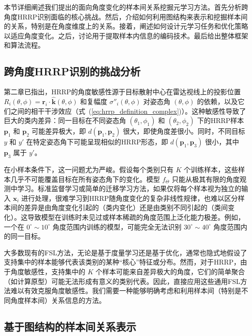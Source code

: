 本节详细阐述我们提出的面向角度变化的样本间关系挖掘元学习方法。首先分析跨角度HRRP识别面临的核心挑战。然后，介绍如何利用图结构来表示和挖掘样本间的关系，特别是在角度维度上的关系。接着，阐述如何设计元学习任务和优化策略以适应角度变化。之后，讨论用于提取样本内信息的编码技术。最后给出整体框架和算法流程。

\subsection{跨角度HRRP识别的挑战分析}
\label{subsec:angle_challenge_analysis}

第二章已指出，HRRP的角度敏感性源于目标散射中心在雷达视线上的投影位置 $R_i(\theta, \phi) = \mathbf{r}_i \cdot \hat{\mathbf{k}}(\theta, \phi)$ 和复幅度 $\sigma''_i(\theta, \phi)$ 对姿态角 $(\theta, \phi)$ 的依赖，以及它们之间的相干干涉效应（式~(\ref{eq:hrrp_definition_complex})）。这种敏感性导致了巨大的类内差异：同一目标在不同姿态角 $(\theta_1, \phi_1)$ 和 $(\theta_2, \phi_2)$ 下的HRRP样本 $\mathbf{p}_1$ 和 $\mathbf{p}_2$ 可能差异极大，即 $d(\mathbf{p}_1, \mathbf{p}_2)$ 很大，即使角度差很小。同时，不同目标 $y$ 和 $y'$ 在特定姿态角下可能呈现相似的HRRP形态，即 $d(\mathbf{p}_1, \mathbf{p}_3)$ 很小，其中 $\mathbf{p}_3$ 属于 $y'$。

在小样本条件下，这一问题尤为严峻。假设每个类别只有 $K$ 个训练样本，这些样本几乎不可能覆盖目标在所有姿态角下的变化。模型 $f_\Theta$ 只能从极其有限的角度观测中学习。标准监督学习或简单的迁移学习方法，如果仅将每个样本视为独立的输入 $\mathbf{x}_i$ 进行处理，很难学习到HRRP随角度变化的复杂非线性规律，也难以区分样本间的差异是由角度变化引起的（类内变化）还是由类别不同引起的（类间变化）。这导致模型在训练时未见过或样本稀疏的角度范围上泛化能力极差。例如，一个在 $0^\circ \sim 10^\circ$ 角度范围内训练的模型，可能完全无法识别 $30^\circ \sim 40^\circ$ 角度范围内的同一目标。

大多数现有的FSL方法，无论是基于度量学习还是基于优化，通常也隐式地假设了支持集中的样本能够代表该类别的某种“核心”特征或分布。然而，对于HRRP，由于角度敏感性，支持集中的 $K$ 个样本可能来自差异极大的角度，它们的简单聚合（如计算原型）可能无法形成有意义的类别代表。因此，直接应用这些通用FSL方法难以有效克服角度敏感性。我们需要一种能够明确考虑和利用样本间（特别是不同角度样本间）关系信息的方法。

\subsection{基于图结构的样本间关系表示}
\label{subsec:graph_relation_representation}

